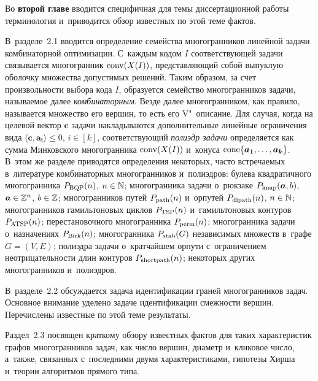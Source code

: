 
Во \textbf{второй главе} вводится специфичная для темы диссертационной работы терминология и~приводится обзор известных по этой теме фактов. 

В~разделе~2.1
вводится определение семейства многогранников линейной задачи комбинаторной оптимизации. С~каждым кодом $I$ соответствующей задачи связывается многогранник $\operatorname{conv}(X(I))$, представляющий собой выпуклую оболочку множества допустимых решений. Таким образом, за счет произвольности выбора кода $I$, образуется семейство многогранников задачи, называемое далее \emph{комбинаторным}. %
Везде далее многогранником, как правило, называется множество его вершин, то есть его V"~описание. 
Для случая, когда на целевой вектор $\bm{c}$ задачи накладываются дополнительные линейные ограничения вида $\langle\bm{c}, \bm{a_i}\rangle \le 0$, $i \in [k]$, соответствующий \emph{полиэдр задачи} определяется как сумма Минковского многогранника $\operatorname{conv}(X(I))$ и~конуса %
$\operatorname{cone}\{\bm{a_1}, \dots, \bm{a_k}\}$.
В~этом же разделе приводятся определения некоторых, часто встречаемых в~литературе комбинаторных многогранников и~полиэдров: булева квадратичного многогранника $P_{\textup{BQP}}(n)$, $n \in \mathbb{N}$; 
многогранника задачи о~рюкзаке $P_{\textup{knap}}(\bm{a},b)$, $\bm{a} \in \mathbb{Z}^n$, $b \in \mathbb{Z}$;
многогранников путей $P_{\textup{path}}(n)$ и~орпутей $P_{\textup{dipath}}(n)$, $n\in \mathbb{N}$;
многогранников гамильтоновых циклов $P_{\textup{TSP}}(n)$ и~гамильтоновых контуров $P_{\textup{ATSP}}(n)$;
перестановочного многогранника $P_{\textup{perm}}(n)$; многогранника задачи о~назначениях $P_{\textup{Birk}}(n)$; многогранника $P_{\textup{stab}}(G)$ независимых множеств в~графе $G=(V,E)$;
полиэдра задачи о~кратчайшем орпути с~ограничением неотрицательности длин контуров $P_{\textup{shortpath}}(n)$; некоторых других многогранников и~полиэдров.

В~разделе~2.2 обсуждается задача идентификации граней многогранников задач. Основное внимание уделено задаче идентификации смежности вершин. %
Перечислены известные по этой теме результаты.

Раздел~2.3 посвящен краткому обзору известных фактов для таких характеристик графов многогранников задач, как число вершин, диаметр и~кликовое число, а~также, связанных с~последними двумя характеристиками, гипотезы Хирша и~теории алгоритмов прямого типа.

